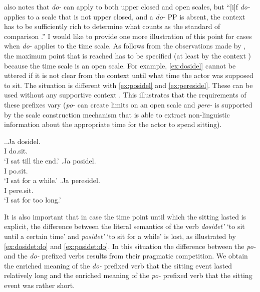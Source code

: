 \citet{Kagan:12} also notes that \textit{do-}   can apply to both upper closed and open scales, but ``[i]f \textit{do-}   applies to a scale that is not upper closed, and a \textit{do-}  PP is absent, the context   has to be sufficiently rich to determine what counts as the standard of comparison .'' I would like to provide one more illustration of this point for cases when \textit{do-}   applies to the time scale. As follows from the observations made by \citet{Kagan:12}, the maximum point that is reached has to be specified (at least by the context  ) because the time scale is an open scale. For example, \ref{ex:dosidel} cannot be uttered if it is not clear from the context   until what time the actor was supposed to sit. The situation is different with \ref{ex:posidel} and \ref{ex:peresidel}. These can be used without any supportive context  . This illustrates that the requirements of these prefixes vary (\textit{po-}   can create limits on an open scale and \textit{pere-}   is supported by the scale construction mechanism that is able to extract non-linguistic information about the appropriate time for the actor to spend sitting).

\ex.\ag.\label{ex:dosidel}Ja dosidel.\\
I do.sit.\\
\trans `I sat till the end.'
\bg.\label{ex:posidel}Ja posidel.\\
I po.sit.\\
\trans `I sat for a while.'
\bg.\label{ex:peresidel}Ja peresidel.\\
I pere.sit.\\
\trans `I sat for too long.'

It is also important that in case the time point until which the sitting lasted is explicit, the difference between the literal semantics of the verb \textit{dosidet'} `to sit until a certain time' and \textit{posidet'} `to sit for a while' is lost, as illustrated by \ref{ex:dosidet:do} and \ref{ex:posidet:do}. In this situation the difference between the \textit{po-}   and the \textit{do-}  prefixed verbs results from their pragmatic competition. We obtain the enriched meaning of the \textit{do-}  prefixed verb that the sitting event lasted relatively long and the enriched meaning of the \textit{po-}  prefixed verb that the sitting event was rather short. 

